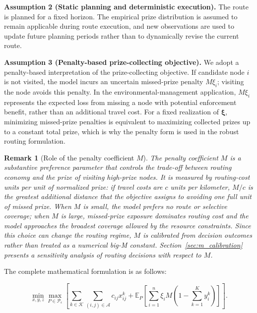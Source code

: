 \documentclass[preprint,12pt,authoryear]{elsarticle}
\newtheorem{remark}{Remark}
\theoremstyle{definition}
\begin{document}
\textbf{Assumption 2 (Static planning and deterministic execution).}
The route is planned for a fixed horizon. The empirical prize distribution is assumed to remain applicable during route execution, and new observations are used to update future planning periods rather than to dynamically revise the current route.

\textbf{Assumption 3 (Penalty-based prize-collecting objective).}
We adopt a penalty-based interpretation of the prize-collecting objective. If candidate node $i$ is not visited, the model incurs an uncertain missed-prize penalty $M\xi_i$; visiting the node avoids this penalty. In the environmental-management application, $M\xi_i$ represents the expected loss from missing a node with potential enforcement benefit, rather than an additional travel cost. For a fixed realization of $\boldsymbol{\xi}$, minimizing missed-prize penalties is equivalent to maximizing collected prizes up to a constant total prize, which is why the penalty form is used in the robust routing formulation.


\begin{remark}[Role of the penalty coefficient $M$]

The penalty coefficient $M$ is a substantive preference parameter that controls the trade-off between routing economy and the prize of visiting high-prize nodes. It is measured by routing-cost units per unit of normalized prize: if travel costs are $c$ units per kilometer, $M/c$ is the greatest additional distance that the objective assigns to avoiding one full unit of missed prize. When $M$ is small, the model prefers no route or selective coverage; when $M$ is large, missed-prize exposure dominates routing cost and the model approaches the broadest coverage allowed by the resource constraints. Since this choice can change the routing regime, $M$ is calibrated from decision outcomes rather than treated as a numerical big-M constant. Section~\ref{sec:m_calibration} presents a sensitivity analysis of routing decisions with respect to $M$.

\end{remark}

 





The complete mathematical formulation is as follows:

\begin{equation}
\min_{x,y,z} \max_{P \in \mathcal{P}_\epsilon} \left[ \sum_{k\in\mathcal{K}}\sum_{(i,j)\in\mathcal{A}} c_{ij}x_{ij}^k + \mathbb{E}_P \left[ \sum_{i=1}^{n} \xi_i M \left(1 - \sum_{k=1}^{K} y_i^k \right) \right] \right].
\label{equoj}
\end{equation}
\end{document}
